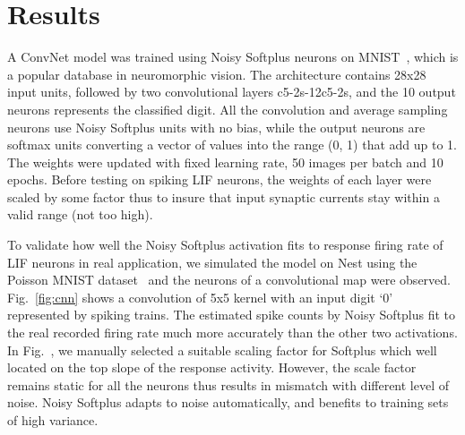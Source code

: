 \documentclass[runningheads,a4paper]{llncs}
\begin{document}
\section{Results}
A ConvNet model was trained using Noisy Softplus neurons on MNIST~\cite{lecun1998gradient}, which is a popular database in neuromorphic vision.
The architecture contains 28x28 input units, followed by two convolutional layers c5-2s-12c5-2s, and the 10 output neurons represents the classified digit.
All the convolution and average sampling neurons use Noisy Softplus units with no bias, while the output neurons are softmax units converting a vector of values into the range (0, 1) that add up to 1.
The weights were updated with fixed learning rate, 50 images per batch and 10 epochs.
Before testing on spiking LIF neurons, the weights of each layer were scaled by some factor thus to insure that input synaptic currents stay within a valid range (not too high).

To validate how well the Noisy Softplus activation fits to response firing rate of LIF neurons in real application, we simulated the model on Nest using the Poisson MNIST dataset~\cite{liu2016bench} and the neurons of a convolutional map were observed.
Fig.~\ref{fig:cnn} shows a convolution of 5x5 kernel with an input digit `0' represented by spiking trains.
The estimated spike counts by Noisy Softplus fit to the real recorded firing rate much more accurately than the other two activations.
In Fig.~, we manually selected a suitable scaling factor for Softplus which well located on the top slope of the response activity.
However, the scale factor remains static for all the neurons thus results in mismatch with different level of noise.
Noisy Softplus adapts to noise automatically, and benefits to training sets of high variance.
\end{document}
